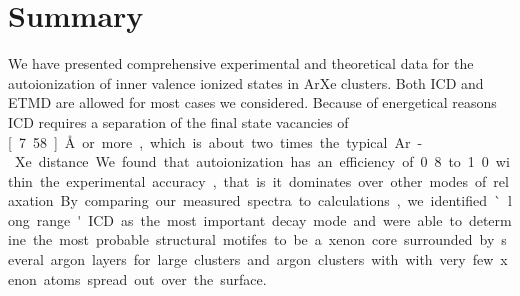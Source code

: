 \section{Summary}
%
We have presented comprehensive experimental and theoretical data for the
autoionization of inner valence ionized states in ArXe clusters.
Both ICD and ETMD are allowed for most cases we considered.
Because of energetical reasons ICD requires a separation of the final state
vacancies of \unit[7.58]{\AA} or more, which is about two times the typical
Ar-Xe distance.
We found that autoionization has an efficiency of 0.8 to 1.0 within the
experimental accuracy, that is it dominates over other modes of relaxation.
By comparing our measured spectra to calculations, we identified `long range'
ICD as the most important decay mode and were able to determine the most
probable structural motifes to be a xenon core surrounded by several argon layers
for large clusters and argon clusters with with very few xenon atoms spread out
over the surface.
